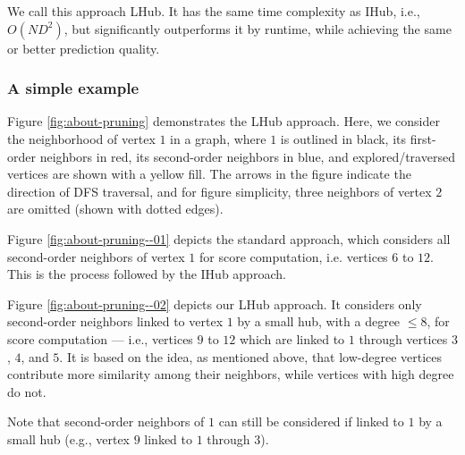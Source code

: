 We call this approach LHub. It has the same time complexity as IHub, i.e., $O(ND^2)$, but significantly outperforms it by runtime, while achieving the same or better prediction quality.


\subsubsection{A simple example}

Figure \ref{fig:about-pruning} demonstrates the LHub approach. Here, we consider the neighborhood of vertex $1$ in a graph, where $1$ is outlined in black, its first-order neighbors in red, its second-order neighbors in blue, and explored/traversed vertices are shown with a yellow fill. The arrows in the figure indicate the direction of DFS traversal, and for figure simplicity, three neighbors of vertex $2$ are omitted (shown with dotted edges).


Figure \ref{fig:about-pruning--01} depicts the standard approach, which considers all second-order neighbors of vertex $1$ for score computation, i.e. vertices $6$ to $12$. This is the process followed by the IHub approach.


Figure \ref{fig:about-pruning--02} depicts our LHub approach. It considers only second-order neighbors linked to vertex $1$ by a small hub, with a degree $\leq 8$, for score computation --- i.e., vertices $9$ to $12$ which are linked to $1$ through vertices $3$, $4$, and $5$. It is based on the idea, as mentioned above, that low-degree vertices contribute more similarity among their neighbors, while vertices with high degree do not. Note that second-order neighbors of $1$ can still be considered if linked to $1$ by a small hub (e.g., vertex $9$ linked to $1$ through $3$).


